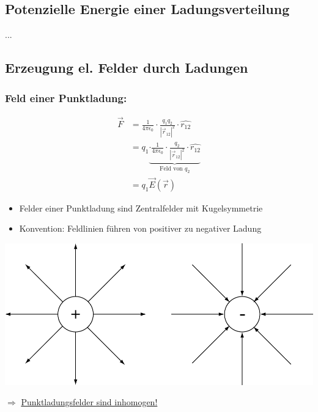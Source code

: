 \documentclass[11pt]{article}
\begin{document}
\subsection{Potenzielle Energie einer Ladungsverteilung}

...

\subsection{Erzeugung el. Felder durch Ladungen}

	\subsubsection{Feld einer Punktladung:}
	
	\begin{align*}
		\vec{F} &= \frac{1}{4\pi\epsilon_0} \cdot \frac{q_1 q_2}{ |\vec{r}_{12}|^2 } \cdot \hat{r_{12}} \\
					&=q_1 \underbrace{ \cdot \frac{1}{4\pi\epsilon_0} \cdot \frac{q_2}{ |\vec{r}_{12}|^2 } \cdot \hat{r_{12}}  }_{\text{Feld von }q_2} \\
					&=q_1 \vec{E}(\vec{r})
	\end{align*}
	\begin{itemize}
		\item Felder einer Punktladung sind Zentralfelder mit Kugelsymmetrie
		\item Konvention: Feldlinien führen von positiver zu negativer Ladung
	\end{itemize}
	\begin{center}
		\includegraphics[width=0.7\linewidth]{skizzen/14/14_4B0}
	\end{center}

	$ \Rightarrow $ \underline{Punktladungsfelder sind inhomogen!}
	
\end{document}
